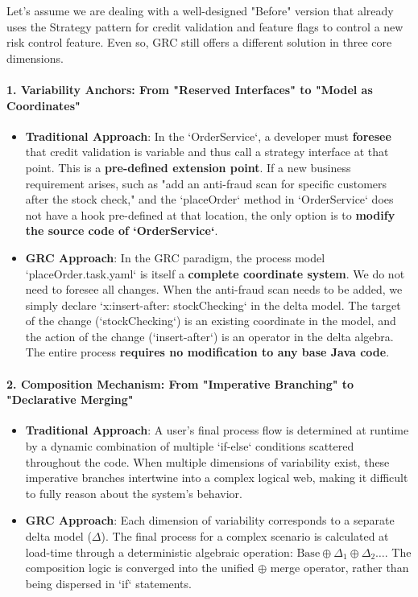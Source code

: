 \documentclass[11pt]{article}
\begin{document}
Let's assume we are dealing with a well-designed "Before" version that already uses the Strategy pattern for credit validation and feature flags to control a new risk control feature. Even so, GRC still offers a different solution in three core dimensions.

\paragraph{1. Variability Anchors: From "Reserved Interfaces" to "Model as Coordinates"}
\begin{itemize}
    \item \textbf{Traditional Approach}: In the `OrderService`, a developer must \textbf{foresee} that credit validation is variable and thus call a strategy interface at that point. This is a \textbf{pre-defined extension point}. If a new business requirement arises, such as "add an anti-fraud scan for specific customers after the stock check," and the `placeOrder` method in `OrderService` does not have a hook pre-defined at that location, the only option is to \textbf{modify the source code of `OrderService`}.
    \item \textbf{GRC Approach}: In the GRC paradigm, the process model `placeOrder.task.yaml` is itself a \textbf{complete coordinate system}. We do not need to foresee all changes. When the anti-fraud scan needs to be added, we simply declare `x:insert-after: stockChecking` in the delta model. The target of the change (`stockChecking`) is an existing coordinate in the model, and the action of the change (`insert-after`) is an operator in the delta algebra. The entire process \textbf{requires no modification to any base Java code}.
\end{itemize}

\paragraph{2. Composition Mechanism: From "Imperative Branching" to "Declarative Merging"}
\begin{itemize}
    \item \textbf{Traditional Approach}: A user's final process flow is determined at runtime by a dynamic combination of multiple `if-else` conditions scattered throughout the code. When multiple dimensions of variability exist, these imperative branches intertwine into a complex logical web, making it difficult to fully reason about the system's behavior.
    \item \textbf{GRC Approach}: Each dimension of variability corresponds to a separate delta model ($\Delta$). The final process for a complex scenario is calculated at load-time through a deterministic algebraic operation: $\text{Base} \oplus \Delta_1 \oplus \Delta_2 \dots$. The composition logic is converged into the unified $\oplus$ merge operator, rather than being dispersed in `if` statements.
\end{itemize}
\end{document}
